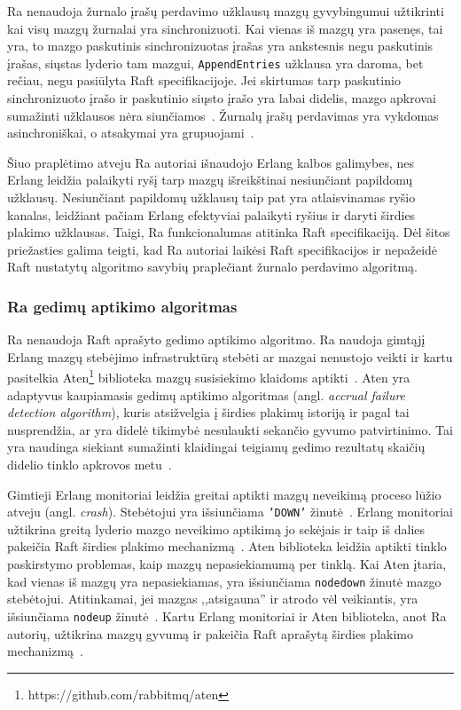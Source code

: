 \documentclass{VUMIFPSkursinis}
\begin{document}
Ra nenaudoja žurnalo įrašų perdavimo užklausų mazgų gyvybingumui užtikrinti kai visų mazgų žurnalai yra sinchronizuoti. Kai vienas iš mazgų yra pasenęs, tai yra, to mazgo paskutinis sinchronizuotas įrašas yra ankstesnis negu paskutinis įrašas, siųstas lyderio tam mazgui, \texttt{AppendEntries} užklausa yra daroma, bet rečiau, negu pasiūlyta Raft specifikacijoje. Jei skirtumas tarp paskutinio sinchronizuoto įrašo ir paskutinio siųsto įrašo yra labai didelis, mazgo apkrovai sumažinti užklausos nėra siunčiamos~\cite{rabbitmqra}. Žurnalų įrašų perdavimas yra vykdomas asinchroniškai, o atsakymai yra grupuojami~\cite{rabbitmqra}.

Šiuo praplėtimo atveju Ra autoriai išnaudojo Erlang kalbos galimybes, nes Erlang leidžia palaikyti ryšį tarp mazgų išreikštinai nesiunčiant papildomų užklausų. Nesiunčiant papildomų užklausų taip pat yra atlaisvinamas ryšio kanalas, leidžiant pačiam Erlang efektyviai palaikyti ryšius ir daryti širdies plakimo užklausas. Taigi, Ra funkcionalumas atitinka Raft specifikaciją. Dėl šitos priežasties galima teigti, kad Ra autoriai laikėsi Raft specifikacijos ir nepažeidė Raft nustatytų algoritmo savybių praplečiant žurnalo perdavimo algoritmą.

\subsubsection{Ra gedimų aptikimo algoritmas}

Ra nenaudoja Raft aprašyto gedimo aptikimo algoritmo. Ra naudoja gimtąjį Erlang mazgų stebėjimo infrastruktūrą stebėti ar mazgai nenustojo veikti ir kartu pasitelkia Aten\footnote{https://github.com/rabbitmq/aten} biblioteka mazgų susisiekimo klaidoms aptikti~\cite{rabbitmqra}. Aten yra adaptyvus kaupiamasis gedimų aptikimo algoritmas (angl. \textit{accrual failure detection algorithm}), kuris atsižvelgia į širdies plakimų istoriją ir pagal tai nusprendžia, ar yra didelė tikimybė nesulaukti sekančio gyvumo patvirtinimo. Tai yra naudinga siekiant sumažinti klaidingai teigiamų gedimo rezultatų skaičių didelio tinklo apkrovos metu~\cite{satzger2007_new_accrual_failure}.  

Gimtieji Erlang monitoriai leidžia greitai aptikti mazgų neveikimą proceso lūžio atveju (angl. \textit{crash}). Stebėtojui yra išsiunčiama \texttt{'DOWN'} žinutė~\cite{ericsson_erlang_processes_2016}. Erlang monitoriai užtikrina greitą lyderio mazgo neveikimo aptikimą jo sekėjais ir taip iš dalies pakeičia Raft širdies plakimo mechanizmą~\cite{rabbitmqra}. Aten biblioteka leidžia aptikti tinklo paskirstymo problemas, kaip mazgų nepasiekiamumą per tinklą. Kai Aten įtaria, kad vienas iš mazgų yra nepasiekiamas, yra išsiunčiama \texttt{nodedown} žinutė mazgo stebėtojui. Atitinkamai, jei mazgas ,,atsigauna'' ir atrodo vėl veikiantis, yra išsiunčiama \texttt{nodeup} žinutė~\cite{rabbitmq_aten_2020}. Kartu Erlang monitoriai ir Aten biblioteka, anot Ra autorių, užtikrina mazgų gyvumą ir pakeičia Raft aprašytą širdies plakimo mechanizmą~\cite{rabbitmqra}. 
\end{document}
